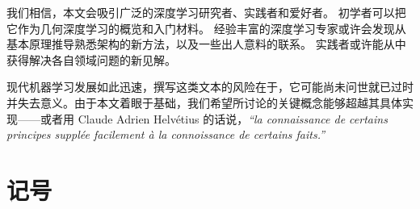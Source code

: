 \documentclass[11pt]{book}              %
\makeatletter
\renewcommand{\thesection}{%
  \ifnum\c@chapter<1 \@arabic\c@section
  \else \thechapter.\@arabic\c@section
  \fi
}
\renewcommand*{\sectionmark}[1]{ \markright{\thesection\ ##1} }%
\makeatother
\begin{document}
我们相信，本文会吸引广泛的深度学习研究者、实践者和爱好者。
%
初学者可以把它作为几何深度学习的概览和入门材料。
%
经验丰富的深度学习专家或许会发现从基本原理推导熟悉架构的新方法，以及一些出人意料的联系。
%
实践者或许能从中获得解决各自领域问题的新见解。


现代机器学习发展如此迅速，撰写这类文本的风险在于，它可能尚未问世就已过时并失去意义。由于本文着眼于基础，我们希望所讨论的关键概念能够超越其具体实现——或者用 Claude Adrien Helvétius 的话说，{\em ``la connaissance de certains principes supplée facilement à la connoissance de certains faits.'' }

%

\section*{记号}
\sectionmark{记号}
\end{document}
